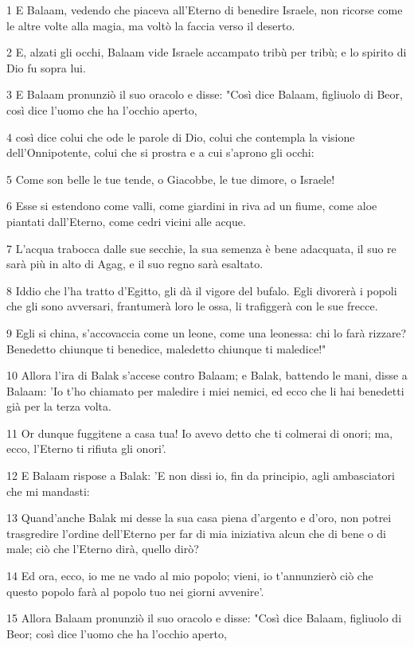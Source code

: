 \par 1 E Balaam, vedendo che piaceva all'Eterno di benedire Israele, non ricorse come le altre volte alla magia, ma voltò la faccia verso il deserto.
\par 2 E, alzati gli occhi, Balaam vide Israele accampato tribù per tribù; e lo spirito di Dio fu sopra lui.
\par 3 E Balaam pronunziò il suo oracolo e disse: "Così dice Balaam, figliuolo di Beor, così dice l'uomo che ha l'occhio aperto,
\par 4 così dice colui che ode le parole di Dio, colui che contempla la visione dell'Onnipotente, colui che si prostra e a cui s'aprono gli occhi:
\par 5 Come son belle le tue tende, o Giacobbe, le tue dimore, o Israele!
\par 6 Esse si estendono come valli, come giardini in riva ad un fiume, come aloe piantati dall'Eterno, come cedri vicini alle acque.
\par 7 L'acqua trabocca dalle sue secchie, la sua semenza è bene adacquata, il suo re sarà più in alto di Agag, e il suo regno sarà esaltato.
\par 8 Iddio che l'ha tratto d'Egitto, gli dà il vigore del bufalo. Egli divorerà i popoli che gli sono avversari, frantumerà loro le ossa, li trafiggerà con le sue frecce.
\par 9 Egli si china, s'accovaccia come un leone, come una leonessa: chi lo farà rizzare? Benedetto chiunque ti benedice, maledetto chiunque ti maledice!"
\par 10 Allora l'ira di Balak s'accese contro Balaam; e Balak, battendo le mani, disse a Balaam: 'Io t'ho chiamato per maledire i miei nemici, ed ecco che li hai benedetti già per la terza volta.
\par 11 Or dunque fuggitene a casa tua! Io avevo detto che ti colmerai di onori; ma, ecco, l'Eterno ti rifiuta gli onori'.
\par 12 E Balaam rispose a Balak: 'E non dissi io, fin da principio, agli ambasciatori che mi mandasti:
\par 13 Quand'anche Balak mi desse la sua casa piena d'argento e d'oro, non potrei trasgredire l'ordine dell'Eterno per far di mia iniziativa alcun che di bene o di male; ciò che l'Eterno dirà, quello dirò?
\par 14 Ed ora, ecco, io me ne vado al mio popolo; vieni, io t'annunzierò ciò che questo popolo farà al popolo tuo nei giorni avvenire'.
\par 15 Allora Balaam pronunziò il suo oracolo e disse: "Così dice Balaam, figliuolo di Beor; così dice l'uomo che ha l'occhio aperto,

